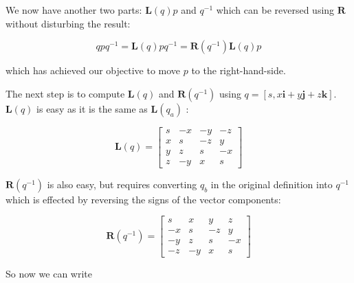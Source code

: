 \documentclass[10pt]{article}
\begin{document}
We now have another two parts: $\mathbf{L}(q) p$ and $q^{-1}$ which can be reversed using $\mathbf{R}$ without disturbing the result:

$$
q p q^{-1}=\mathbf{L}(q) p q^{-1}=\mathbf{R}\left(q^{-1}\right) \mathbf{L}(q) p
$$

which has achieved our objective to move $p$ to the right-hand-side.

The next step is to compute $\mathbf{L}(q)$ and $\mathbf{R}\left(q^{-1}\right)$ using $q=[s, x \mathbf{i}+y \mathbf{j}+z \mathbf{k}]$. $\mathbf{L}(q)$ is easy as it is the same as $\mathbf{L}\left(q_{a}\right)$ :

$$
\mathbf{L}(q)=\left[\begin{array}{cccc}
s & -x & -y & -z \\
x & s & -z & y \\
y & z & s & -x \\
z & -y & x & s
\end{array}\right]
$$

$\mathbf{R}\left(q^{-1}\right)$ is also easy, but requires converting $q_{b}$ in the original definition into $q^{-1}$ which is effected by reversing the signs of the vector components:

$$
\mathbf{R}\left(q^{-1}\right)=\left[\begin{array}{cccc}
s & x & y & z \\
-x & s & -z & y \\
-y & z & s & -x \\
-z & -y & x & s
\end{array}\right]
$$

So now we can write
\end{document}
